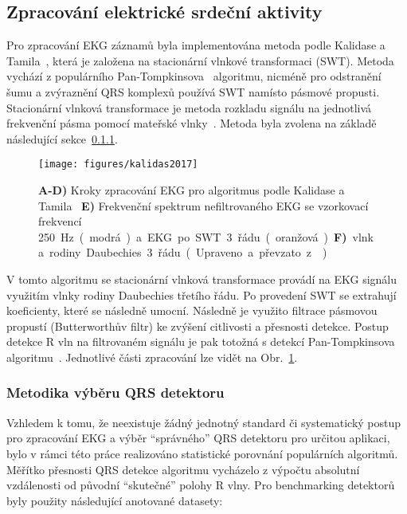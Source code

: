 \subsection{Zpracování elektrické srdeční aktivity}
\label{subsec:zpracovani_ekg}
Pro zpracování EKG záznamů byla implementována metoda podle Kalidase a
Tamila~\cite{kalidas2017}, která je založena na stacionární vlnkové transformaci
(\gls{SWT}). Metoda vychází z populárního Pan-Tompkinsova~\cite{Tompkins1985}
algoritmu, nicméně pro odstranění šumu a zvýraznění QRS komplexů používá
\gls{SWT} namísto pásmové propusti. Stacionární vlnková transformace je metoda
rozkladu signálu na jednotlivá frekvenční pásma pomocí mateřské
vlnky~\cite{Nason1995}. Metoda byla zvolena na základě následující
sekce~\ref{subsubsec:vyberqrs}.

\begin{figure}[H]
    \begin{center}
        \texttt{[image: figures/kalidas2017]}
        \caption{\textbf{A-D)} Kroky zpracování EKG pro algoritmus podle
            Kalidase a Tamila~\cite{kalidas2017} \textbf{E)} Frekvenční spektrum
            nefiltrovaného EKG se vzorkovací frekvencí 250~\si\Hz~(modrá) a EKG po
            SWT 3. řádu (oranžová). \textbf{F)} vlnka rodiny Daubechies 3. řádu.
            (Upraveno a převzato z~\cite{Porr2019})}
        \label{fig:kalidas_processing}
    \end{center}
\end{figure}

V tomto algoritmu se stacionární vlnková transformace provádí na EKG signálu
využitím vlnky rodiny Daubechies třetího řádu. Po provedení \gls{SWT} se
extrahují koeficienty, které se následně umocní. Následně je využito filtrace
pásmovou propustí (Butterworthův filtr) ke zvýšení citlivosti a přesnosti
detekce. Postup detekce R vln na filtrovaném signálu je pak totožná s detekcí
Pan-Tompkinsova algoritmu~\cite{Tompkins1985}. Jednotlivé části zpracování lze
vidět na Obr.~\ref{fig:kalidas_processing}.

\subsubsection{Metodika výběru QRS detektoru}
\label{subsubsec:vyberqrs}
Vzhledem k tomu, že neexistuje žádný jednotný standard či systematický postup
pro zpracování EKG a výběr \enquote{správného} QRS detektoru pro určitou
aplikaci, bylo v rámci této práce realizováno statistické porovnání populárních
algoritmů. Měřítko přesnosti QRS detekce algoritmu vycházelo z výpočtu absolutní
vzdálenosti od původní \enquote{skutečné} polohy R vlny. Pro benchmarking
detektorů byly použity následující anotované datasety:

